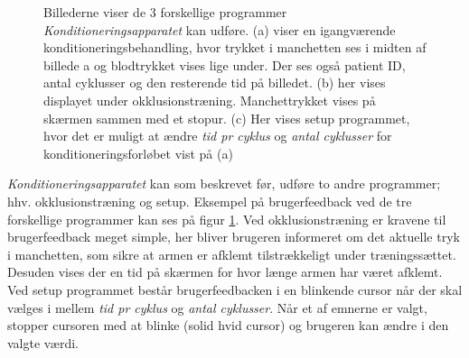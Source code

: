 \begin{figure}[H]
\centering
{}
\caption{Billederne viser de 3 forskellige programmer \textit{Konditioneringsapparatet} kan udføre. (a) viser en igangværende konditioneringsbehandling, hvor trykket i manchetten ses i midten af billede a og blodtrykket vises lige under. Der ses også patient ID, antal cyklusser og den resterende tid på billedet. (b) her vises displayet under okklusionstræning. Manchettrykket vises på skærmen sammen med et stopur. (c) Her vises setup programmet, hvor det er muligt at ændre \textit{tid pr cyklus} og \textit{antal cyklusser} for konditioneringsforløbet vist på (a)}\label{fig:interface}
\end{figure}

\textit{Konditioneringsapparatet} kan som beskrevet før, udføre to andre programmer; hhv. okklusionstræning og setup. Eksempel på brugerfeedback ved de tre forskellige programmer kan ses på figur \ref{fig:interface}. Ved okklusionstræning er kravene til brugerfeedback meget simple, her bliver brugeren informeret om det aktuelle tryk i manchetten, som sikre at armen er afklemt tilstrækkeligt under træningssættet. Desuden vises der en tid på skærmen for hvor længe armen har været afklemt. Ved setup programmet består brugerfeedbacken i en blinkende cursor når der skal vælges i mellem \textit{tid pr cyklus} og \textit{antal cyklusser}. Når et af emnerne er valgt, stopper cursoren med at blinke (solid hvid cursor) og brugeren kan ændre i den valgte værdi.

